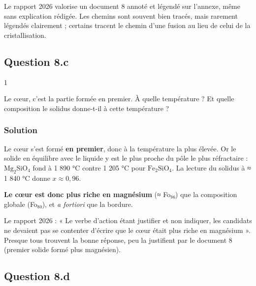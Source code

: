 \documentclass[11pt,a4paper]{article}
\begin{document}
\begin{jury}

Le rapport 2026 valorise un document 8 annoté et légendé sur l'annexe, même sans explication rédigée. Les chemins sont souvent bien tracés, mais rarement légendés clairement ; certains tracent le chemin d'une fusion au lieu de celui de la cristallisation.

\end{jury}

\hypertarget{question-8.c}{%
\subsection{Question 8.c}\label{question-8.c}}

\begin{indication}{1}

Le cœur, c'est la partie formée en premier. À quelle température ? Et quelle composition le solidus donne-t-il à cette température ?

\end{indication}

\hypertarget{solution-25}{%
\subsubsection{Solution}\label{solution-25}}

Le cœur s'est formé \textbf{en premier}, donc à la température la plus élevée. Or le solide en équilibre avec le liquide y est le plus proche du pôle le plus réfractaire : \(\mathrm{Mg_2SiO_4}\) fond à 1 890 °C contre 1 205 °C pour \(\mathrm{Fe_2SiO_4}\). La lecture du solidus à ≈ 1 840 °C donne \(x \approx 0{,}96\).

\textbf{Le cœur est donc plus riche en magnésium} (≈ Fo₉₆) que la composition globale (Fo₈₀), et \emph{a fortiori} que la bordure.

\begin{jury}

Le rapport 2026 : « Le verbe d'action étant justifier et non indiquer, les candidats ne devaient pas se contenter d'écrire que le cœur était plus riche en magnésium ». Presque tous trouvent la bonne réponse, peu la justifient par le document 8 (premier solide formé plus magnésien).

\end{jury}

\hypertarget{question-8.d}{%
\subsection{Question 8.d}\label{question-8.d}}
\end{document}
